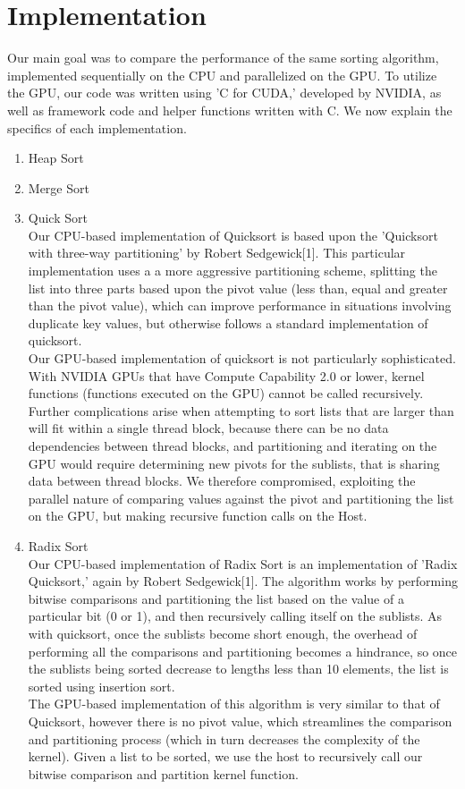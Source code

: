 \documentclass{article}
\begin{document}
\section{Implementation}
Our main goal was to compare the performance of the same sorting algorithm, implemented sequentially on the CPU and parallelized on the GPU. To utilize the GPU, our code was written using 'C for CUDA,' developed by NVIDIA, as well as framework code and helper functions written with C. We now explain the specifics of each implementation.
\begin{enumerate}
  \setlength{\itemsep}{10pt}
  \setlength{\parskip}{10pt}

  \item Heap Sort

  \item Merge Sort 

  \item Quick Sort\\ 
        Our CPU-based implementation of Quicksort is based upon the 'Quicksort with three-way partitioning' by Robert Sedgewick[1]. This particular implementation uses a a more aggressive partitioning scheme, splitting the list into three parts based upon the pivot value (less than, equal and greater than the pivot value), which can improve performance in situations involving duplicate key values, but otherwise follows a standard implementation of quicksort.\\
        Our GPU-based implementation of quicksort is not particularly sophisticated. With NVIDIA GPUs that have Compute Capability 2.0 or lower, kernel functions (functions executed on the GPU) cannot be called recursively. Further complications arise when attempting to sort lists that are larger than will fit within a single thread block, because there can be no data dependencies between thread blocks, and partitioning and iterating on the GPU would require determining new pivots for the sublists, that is sharing data between thread blocks. We therefore compromised, exploiting the parallel nature of comparing values against the pivot and partitioning the list on the GPU, but making recursive function calls on the Host.\\
  \item Radix Sort\\
        Our CPU-based implementation of Radix Sort is an implementation of 'Radix Quicksort,' again by Robert Sedgewick[1]. The algorithm works by performing bitwise comparisons and partitioning the list based on the value of a particular bit (0 or 1), and then recursively calling itself on the sublists. As with quicksort, once the sublists become short enough, the overhead of performing all the comparisons and partitioning becomes a hindrance, so once the sublists being sorted decrease to lengths less than 10 elements, the list is sorted using insertion sort.\\
        The GPU-based implementation of this algorithm is very similar to that of Quicksort, however there is no pivot value, which streamlines the comparison and partitioning process (which in turn decreases the complexity of the kernel). Given a list to be sorted, we use the host to recursively call our bitwise comparison and partition kernel function.
\end{enumerate}
\end{document}
